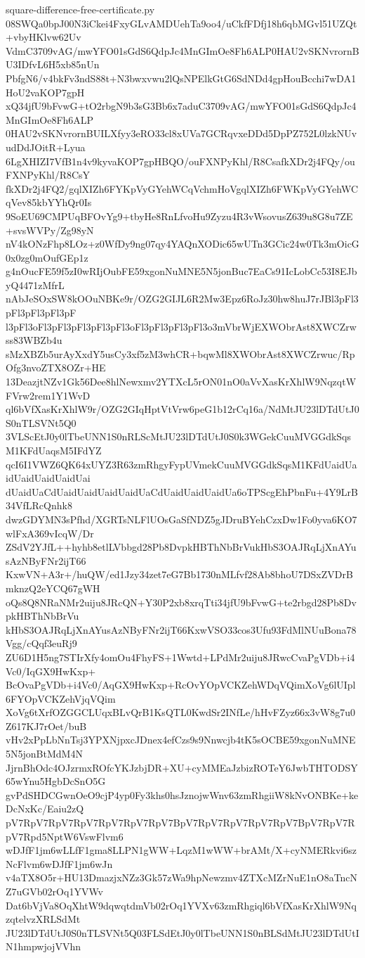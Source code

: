 \documentclass[11pt]{article}
\theoremstyle{definition}
\theoremstyle{remark}
\begin{document}
\begin{filecontents*}[overwrite]{square-difference-free-certificate.py}
08SWQa0bpJ00N3iCkei4FxyGLvAMDUehTa9oo4/uCkfFDfj18h6qbMGvl51UZQt+vbyHKlvw62Uv
VdmC3709vAG/mwYFO01sGdS6QdpJc4MnGImOe8Fh6ALP0HAU2vSKNvrornBU3IDfvL6H5xb85nUn
PbfgN6/v4bkFv3ndS88t+N3bwxvwu2lQsNPElkGtG6SdNDd4gpHouBcchi7wDA1HoU2vaKOP7gpH
xQ34jfU9bFvwG+tO2rbgN9b3sG3Bb6x7aduC3709vAG/mwYFO01sGdS6QdpJc4MnGImOe8Fh6ALP
0HAU2vSKNvrornBUILXfyy3eRO33cl8xUVa7GCRqvxeDDd5DpPZ752L0lzkNUvudDdJOitR+Lyua
6LgXHIZI7VfB1n4v9kyvaKOP7gpHBQO/ouFXNPyKhl/R8CsafkXDr2j4FQy/ouFXNPyKhl/R8CsY
fkXDr2j4FQ2/gqlXIZh6FYKpVyGYehWCqVchmHoVgqlXIZh6FWKpVyGYehWCqVev85kbYYhQr0Is
9SoEU69CMPUqBFOvYg9+tbyHe8RnLfvoHu9Zyzu4R3vWsovusZ639u8G8u7ZE+svsWVPy/Zg98yN
nV4kONzFhp8LOz+z0WfDy9ng07qy4YAQnXODic65wUTn3GCic24w0Tk3mOicG0x0zg0mOufGEp1z
g4nOucFE59f5zI0wRIjOubFE59xgonNuMNE5N5jonBuc7EaCs91IcLobCc53I8EJbyQ4471zMfrL
nAbJeSOxSW8kOOuNBKe9r/OZG2GIJL6R2Mw3Epz6RoJz30hw8huJ7rJBl3pFl3pFl3pFl3pFl3pF
l3pFl3oFl3pFl3pFl3pFl3pFl3oFl3pFl3pFl3pFl3o3mVbrWjEXWObrAst8XWCZrwss83WBZb4u
sMzXBZb5urAyXxdY5usCy3xf5zM3whCR+bqwMl8XWObrAst8XWCZrwuc/RpOfg3nvoZTX8OZr+HE
13DeazjtNZv1Gk56Dee8hlNewxmv2YTXcL5rON01nO0aVvXasKrXhlW9NqzqtWFVrw2rem1Y1WvD
ql6bVfXasKrXhlW9r/OZG2GIqHptVtVrw6peG1b12rCq16a/NdMtJU23lDTdUtJ0S0nTLSVNt5Q0
3VLScEtJ0y0lTbeUNN1S0nRLScMtJU23lDTdUtJ0S0k3WGekCuuMVGGdkSqsM1KFdUaqsM5IFdYZ
qcI6I1VWZ6QK64xUYZ3R63zmRhgyFypUVmekCuuMVGGdkSqsM1KFdUaidUaidUaidUaidUaidUai
dUaidUaCdUaidUaidUaidUaidUaCdUaidUaidUaidUa6oTPScgEhPbnFu+4Y9LrB34VfLRcQnhk8
dwzGDYMN3sPfhd/XGRTsNLFlUOsGaSfNDZ5gJDruBYehCzxDw1Fo0yva6KO7wlFxA369vIcqW/Dr
ZSdV2YJfL++hyhb8etlLVbbgd28Pb8DvpkHBThNbBrVukHbS3OAJRqLjXnAYusAzNByFNr2ijT66
KxwVN+A3r+/huQW/ed1Jzy34zet7eG7Bb1730nMLfvf28Ab8bhoU7DSxZVDrBmknzQ2eYCQ67gWH
oQs8Q8NRaNMr2uiju8JRcQN+Y30P2xb8xrqTti34jfU9bFvwG+te2rbgd28Pb8DvpkHBThNbBrVu
kHbS3OAJRqLjXnAYusAzNByFNr2ijT66KxwVSO33cos3Ufu93FdMlNUuBona78Vgg/cQqf3euRj9
ZU6D1H5ng7STIrXfy4omOu4FhyFS+1Wwtd+LPdMr2uiju8JRwcCvaPgVDb+i4Vc0/IqGX9HwKxp+
BcOvaPgVDb+i4Vc0/AqGX9HwKxp+RcOvYOpVCKZehWDqVQimXoVg6lUIpl6FYOpVCKZehVjqVQim
XoVg6tXrfOZGGCLUqxBLvQrB1KsQTL0KwdSr2INfLe/hHvFZyz66x3vW8g7u0Z617KJ7rOet/buB
vHv2xPpLbNnTsj3YPXNjpxcJDnex4efCzs9s9Nnwcjb4tK5sOCBE59xgonNuMNE5N5jonBtMdM4N
JjrnBhOdc4OJzrmxROfcYKJzbjDR+XU+cyMMEaJzbizROTeY6JwbTHTODSY65wYnu5HgbDcSnO5G
gvPdSHDCGwnOeO9cjP4yp0Fy3khs0hsJznojwWnv63zmRhgiiW8kNvONBKe+keDcNxKc/Eaiu2zQ
pV7RpV7RpV7RpV7RpV7RpV7RpV7BpV7RpV7RpV7RpV7RpV7BpV7RpV7RpV7Rpd5NptW6VswFlvm6
wDJfF1jm6wLLfF1gma8LLPN1gWW+LqzM1wWW+brAMt/X+cyNMERkvi6szNcFlvm6wDJfF1jm6wJn
v4aTX8O5r+HU13DmazjxNZz3Gk57zWa9hpNewzmv4ZTXcMZrNuE1nO8aTncNZ7uGVb02rOq1YVWv
Dat6bVjVa8OqXhtW9dqwqtdmVb02rOq1YVXv63zmRhgiql6bVfXasKrXhlW9NqzqtelvzXRLSdMt
JU23lDTdUtJ0S0nTLSVNt5Q03FLSdEtJ0y0lTbeUNN1S0nBLSdMtJU23lDTdUtIN1hmpwjojVVhn

\end{filecontents*}
\end{document}
